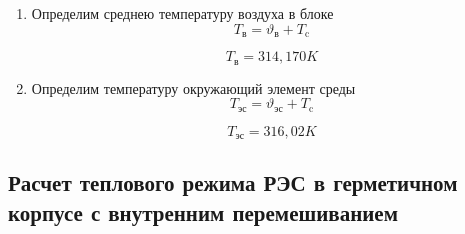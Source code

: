 \begin{enumerate}[label={\arabic*.}]
  \item Определим среднею температуру воздуха в блоке
    \begin{equation}
      T\mathrm{_в} = \vartheta\mathrm{_в} + T\mathrm{_c}
    \end{equation}

    $$T\mathrm{_в} =314,170 K$$
  \item Определим температуру окружающий элемент среды
    \begin{equation}
      T\mathrm{_{эс}} = \vartheta\mathrm{_{эс}} + T\mathrm{_c}
    \end{equation}
    
    $$T\mathrm{_{эс}} = 316,02 K$$
\end{enumerate}

\subsection{Расчет теплового режима РЭС в герметичном корпусе с внутренним перемешиванием}

